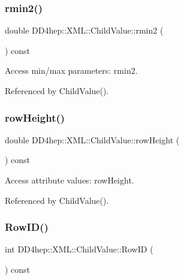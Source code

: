 \subsubsection{\texorpdfstring{rmin2()}{rmin2()}}
{\footnotesize\ttfamily double D\+D4hep\+::\+X\+M\+L\+::\+Child\+Value\+::rmin2 (\begin{DoxyParamCaption}{ }\end{DoxyParamCaption}) const}



Access min/max parameters\+: rmin2. 



Referenced by Child\+Value().

\hypertarget{struct_d_d4hep_1_1_x_m_l_1_1_child_value_af2448e19096375c32e56faf96ce16ff1}{}\label{struct_d_d4hep_1_1_x_m_l_1_1_child_value_af2448e19096375c32e56faf96ce16ff1} 
\subsubsection{\texorpdfstring{row\+Height()}{rowHeight()}}
{\footnotesize\ttfamily double D\+D4hep\+::\+X\+M\+L\+::\+Child\+Value\+::row\+Height (\begin{DoxyParamCaption}{ }\end{DoxyParamCaption}) const}



Access attribute values\+: row\+Height. 



Referenced by Child\+Value().

\hypertarget{struct_d_d4hep_1_1_x_m_l_1_1_child_value_a813be3b9906b204e33517a4c78847561}{}\label{struct_d_d4hep_1_1_x_m_l_1_1_child_value_a813be3b9906b204e33517a4c78847561} 
\subsubsection{\texorpdfstring{Row\+I\+D()}{RowID()}}
{\footnotesize\ttfamily int D\+D4hep\+::\+X\+M\+L\+::\+Child\+Value\+::\+Row\+ID (\begin{DoxyParamCaption}{ }\end{DoxyParamCaption}) const}



